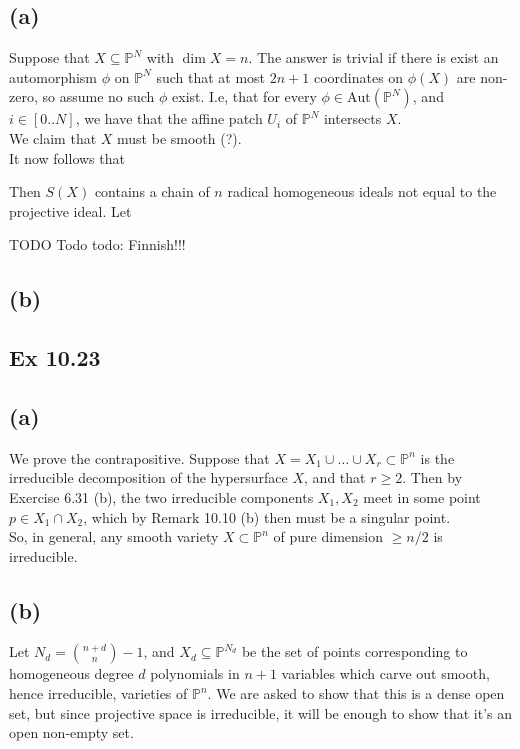 \documentclass{article}
\theoremstyle{definition}
\renewcommand{\P}{\mathbb{P}}
\newcommand{\PP}[1]{\P^{#1}}
\newcommand{\Pn}{\P^n}
\newcommand{\Aut}{\text{Aut}}
\begin{document}
\subsection*{(a)}

Suppose that $X \subseteq \PP{N}$ with $\dim X = n$. The answer is trivial if
there is exist an automorphism $\phi$ on $\PP{N}$ such that at most $2n + 1$
coordinates on $\phi(X)$ are non-zero, so assume no such $\phi$ exist. I.e,
that for every $\phi \in \Aut(\PP{N})$, and $i \in [0..N]$, we have that the
affine patch $U_i$ of $\PP{N}$ intersects $X$. \\

We claim that $X$ must be smooth (?). \\

It now follows that


Then $S(X)$ contains a
chain of $n$ radical homogeneous ideals not equal to the projective ideal.
Let 


TODO Todo todo: Finnish!!!

\subsection*{(b)}

\subsection*{Ex 10.23}

\subsection*{(a)}

We prove the contrapositive. Suppose that $X = X_1 \cup \ldots \cup X_r \subset
\Pn$ is the irreducible decomposition of the hypersurface $X$, and that $r \geq
2$. Then by Exercise 6.31 (b), the two irreducible components $X_1, X_2$ meet
in some point $p \in X_1 \cap X_2$, which by Remark 10.10 (b) then must be a
singular point. \\

So, in general, any smooth variety $X \subset \Pn$ of pure dimension $\geq n/2$
is irreducible.

\subsection*{(b)}

Let $N_d = \binom{n + d}{n} - 1$, and $X_d \subseteq \PP{N_d}$ be the set of points
corresponding to homogeneous degree $d$ polynomials in $n + 1$ variables which
carve out smooth, hence irreducible, varieties of $\PP{n}$. We are asked to
show that this is a dense open set, but since projective space is irreducible,
it will be enough to show that it's an open non-empty set. \\
\end{document}
